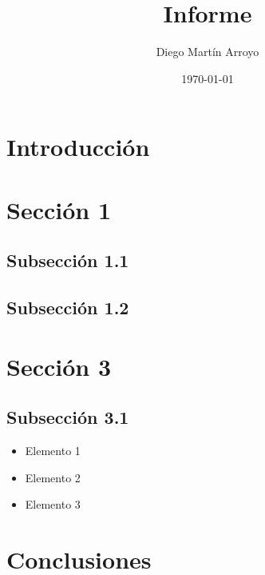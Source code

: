 \documentclass[a4paper,11pt]{acmreport}
\title{Informe}
\date{\today}
\author{Diego Martín Arroyo}
\begin{document}
\section{Introducción}

\lipsum[1]

\newpage
\section{Sección 1}

\lipsum[2]

\subsection*{Subsección 1.1}

\lipsum[3]

\subsection*{Subsección 1.2} 

\lipsum[4]

\newpage
\section{Sección 3}

\subsection*{Subsección 3.1}

\begin{itemize}
	\item Elemento 1
	\item Elemento 2
	\item Elemento 3
\end{itemize}


\section{Conclusiones}

\lipsum[5]
\end{document}
